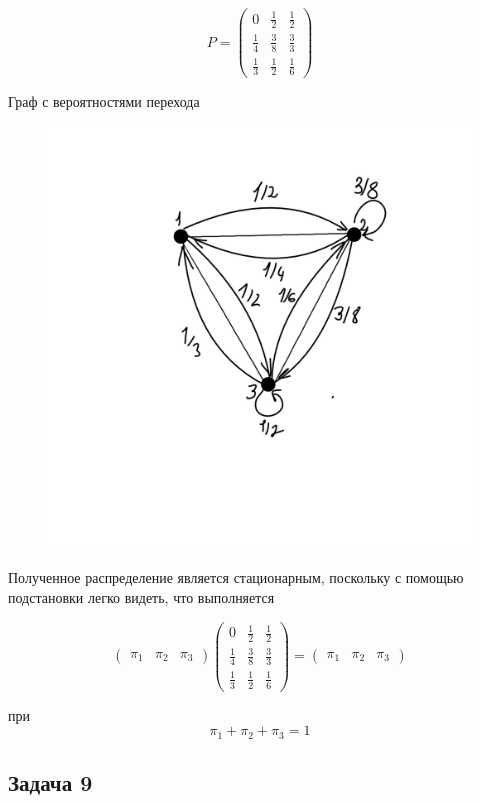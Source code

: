 \documentclass[a4paper,12pt]{article} %
\begin{document}
$$P=\left(\begin{array}{ccc}
0 & \frac{1}{2} & \frac{1}{2} \\
\frac{1}{4} & \frac{3}{8} & \frac{3}{3} \\
\frac{1}{3} & \frac{1}{2} & \frac{1}{6}
\end{array}\right)$$

\newpage 

Граф с вероятностями перехода


\begin{figure}[h!]
	\centering
	\includegraphics[width=0.7\linewidth]{screenshot001}
	\label{fig:screenshot001}
\end{figure}


Полученное распределение является стационарным, поскольку с помощью подстановки легко видеть, что выполняется  

$$\left(\begin{array}{lll}
\pi_{1} & \pi_{2} & \pi_{3}
\end{array}\right)\left(\begin{array}{lll}
0 & \frac{1}{2} & \frac{1}{2} \\
\frac{1}{4} & \frac{3}{8} & \frac{3}{3} \\
\frac{1}{3} & \frac{1}{2} & \frac{1}{6}
\end{array}\right)  = \left(\begin{array}{lll}
\pi_{1} & \pi_{2} & \pi_{3}
\end{array}\right) $$

при  $$\pi_{1}+\pi_{2}+\pi_{3}=1 $$  




\subsection*{Задача 9}
\end{document}
